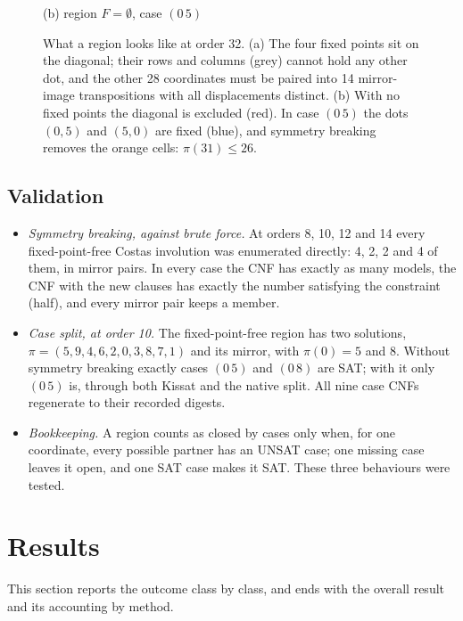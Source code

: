 \documentclass[11pt,a4paper,oneside]{report}
\theoremstyle{definition}
\begin{document}
\begin{figure}[H]
\begin{minipage}{0.47\linewidth}
\par\small (b) region $F=\emptyset$, case $(0\,5)$
\end{minipage}
\caption{What a region looks like at order 32. (a) The four fixed points sit on the
diagonal; their rows and columns (grey) cannot hold any other dot, and the other 28
coordinates must be paired into 14 mirror-image transpositions with all displacements
distinct. (b) With no fixed points the diagonal is excluded (red). In case $(0\,5)$ the dots
$(0,5)$ and $(5,0)$ are fixed (blue), and symmetry breaking removes the orange cells:
$\pi(31)\le 26$.}
\label{p8-fig:regions32}
\end{figure}

\subsection{Validation}
\begingroup\sloppy
\begin{itemize}
\item \emph{Symmetry breaking, against brute force.} At orders 8, 10, 12 and 14 every
fixed-point-free Costas involution was enumerated directly: 4, 2, 2 and 4 of them, in mirror
pairs. In every case the CNF has exactly as many models, the CNF with the new clauses has
exactly the number satisfying the constraint (half), and every mirror pair keeps a member.
\item \emph{Case split, at order 10.} The fixed-point-free region has two solutions,
$\pi=(5,9,4,6,2,0,3,8,7,1)$ and its mirror, with $\pi(0)=5$ and $8$. Without symmetry
breaking exactly cases $(0\,5)$ and $(0\,8)$ are SAT; with it only $(0\,5)$ is, through both
Kissat and the native split. All nine case CNFs regenerate to their recorded digests.
\item \emph{Bookkeeping.} A region counts as closed by cases only when, for one coordinate,
every possible partner has an UNSAT case; one missing case leaves it open, and one SAT case
makes it SAT. These three behaviours were tested.
\end{itemize}
\endgroup

\section{Results}\label{p8-sec:results}
This section reports the outcome class by class, and ends with the overall result and its accounting by method.
\end{document}
